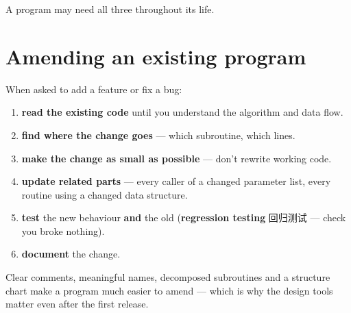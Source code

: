 \documentclass[11pt]{article}
\begin{document}
A program may need all three throughout its life.

\section*{Amending an existing program}

When asked to add a feature or fix a bug:

\begin{enumerate}
\item \textbf{read the existing code} until you understand the algorithm and data flow.

\item \textbf{find where the change goes} — which subroutine, which lines.

\item \textbf{make the change as small as possible} — don't rewrite working code.

\item \textbf{update related parts} — every caller of a changed parameter list, every routine using a changed data structure.

\item \textbf{test} the new behaviour \textbf{and} the old (\textbf{regression testing} 回归测试 — check you broke nothing).

\item \textbf{document} the change.

\end{enumerate}

Clear comments, meaningful names, decomposed subroutines and a structure chart make a program much easier to amend — which is why the design tools matter even after the first release.
\end{document}
